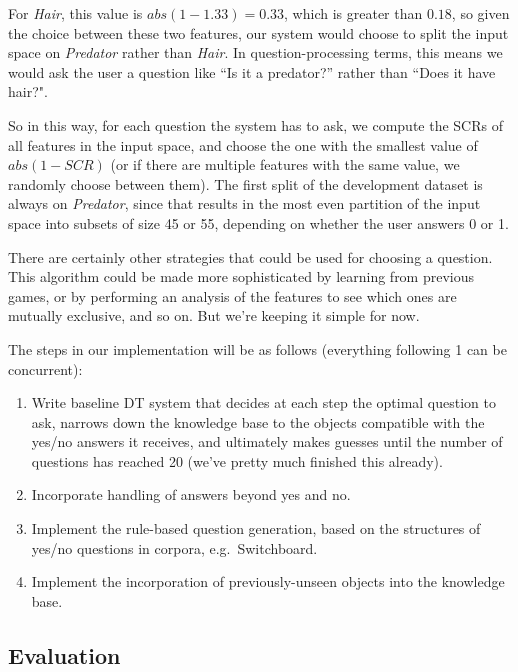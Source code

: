 \documentclass[a4paper,12pt]{article}
\begin{document}
For \textit{Hair}, this value is $abs(1 - 1.33) = 0.33$, which is greater than $0.18$, so given the choice between these two features, our system would choose to split the input space on \textit{Predator} rather than \textit{Hair}.
In question-processing terms, this means we would ask the user a question like ``Is it a predator?'' rather than ``Does it have hair?".

So in this way, for each question the system has to ask, we compute the SCRs of all features in the input space, and choose the one with the smallest value of $abs(1 - SCR)$ (or if there are multiple features with the same value, we randomly choose between them).
The first split of the development dataset is always on \textit{Predator}, since that results in the most even partition of the input space into subsets of size 45 or 55, depending on whether the user answers 0 or 1.

There are certainly other strategies that could be used for choosing a question.
This algorithm could be made more sophisticated by learning from previous games, or by performing an analysis of the features to see which ones are mutually exclusive, and so on.
But we're keeping it simple for now.

The steps in our implementation will be as follows (everything following 1 can be concurrent):
\begin{enumerate}
	\item Write baseline DT system that decides at each step the optimal question to ask, narrows down the knowledge base to the objects compatible with the yes/no answers it receives, and ultimately makes guesses until the number of questions has reached 20 (we've pretty much finished this already).
	\item Incorporate handling of answers beyond yes and no.
	\item Implement the rule-based question generation, based on the structures of yes/no questions in corpora, e.g.\ Switchboard.
	\item Implement the incorporation of previously-unseen objects into the knowledge base.
\end{enumerate}

\subsection*{Evaluation}
\end{document}
